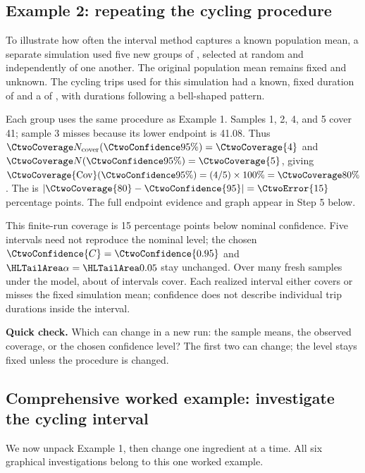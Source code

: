\noindent\begin{minipage}{\linewidth}
\subsection{Example 2: repeating the cycling procedure}
\label{subsec:c2-coverage-example}
To illustrate how often the interval method captures a known population mean, a separate simulation used five new groups of , selected at random and independently of one another. The original population mean remains fixed and unknown. The cycling trips used for this simulation had a known, fixed  duration of  and a  of , with durations following a bell-shaped pattern.

Each group uses the same  procedure as Example 1.
Samples 1, 2, 4, and 5 cover 41; sample 3 misses because its lower endpoint is 41.08.
Thus $\CtwoCoverCount(\CtwoConfidence{95\%})=\CtwoCoverage{4}$ and
$\CtwoTotalCount(\CtwoConfidence{95\%})=\CtwoCoverage{5}$, giving
$\CtwoCoverage{\mathrm{Cov}}(\CtwoConfidence{95\%})=(4/5)\times100\%=\CtwoCoverage{80\%}$.
The  is $|\CtwoCoverage{80}-\CtwoConfidence{95}|=\CtwoError{15}$ percentage points.
The full endpoint evidence and graph appear in Step 5 below.

This finite-run coverage is 15 percentage points below nominal confidence.
Five intervals need not reproduce the nominal level; the chosen
$\CtwoConfidence{C}=\CtwoConfidence{0.95}$ and $\CtwoSignificance{\alpha}=\CtwoSignificance{0.05}$ stay unchanged.
Over many fresh samples under the model, about  of intervals cover.
Each realized interval either covers or misses the fixed simulation mean;
confidence does not describe individual trip durations inside the interval.

\textbf{Quick check.} Which can change in a new run: the sample means, the observed coverage, or the chosen confidence level? The first two can change; the level stays fixed unless the procedure is changed.
\par\vspace{3mm}
\end{minipage}\par

\clearpage

\subsection{Comprehensive worked example: investigate the cycling interval}
\label{subsec:c2-comprehensive}
We now unpack Example 1, then change one ingredient at a time. All six graphical
investigations belong to this one worked example.

